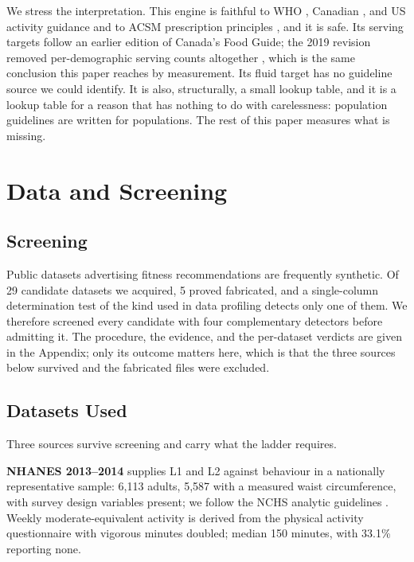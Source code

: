 \documentclass[conference]{IEEEtran}
\begin{document}
We stress the interpretation. This engine is faithful to WHO \cite{bull2020who}, Canadian \cite{ross2020canadian}, and US \cite{piercy2018pag} activity guidance and to ACSM prescription principles \cite{garber2011acsm}, and it is safe. Its serving targets follow an earlier edition of Canada's Food Guide; the 2019 revision removed per-demographic serving counts altogether \cite{healthcanada2019dietary}, which is the same conclusion this paper reaches by measurement. Its fluid target has no guideline source we could identify. It is also, structurally, a small lookup table, and it is a lookup table for a reason that has nothing to do with carelessness: population guidelines are written for populations. The rest of this paper measures what is missing.

\section{Data and Screening}
\label{sec:battery}

\subsection{Screening}
Public datasets advertising fitness recommendations are frequently synthetic. Of 29 candidate datasets we acquired, 5 proved fabricated, and a single-column determination test of the kind used in data profiling \cite{huhtala1999tane, abedjan2015profiling} detects only one of them. We therefore screened every candidate with four complementary detectors before admitting it. The procedure, the evidence, and the per-dataset verdicts are given in the Appendix; only its outcome matters here, which is that the three sources below survived and the fabricated files were excluded.

\subsection{Datasets Used}
Three sources survive screening and carry what the ladder requires.

\textbf{NHANES 2013--2014} \cite{johnson2014nhanes} supplies L1 and L2 against behaviour in a nationally representative sample: 6{,}113 adults, 5{,}587 with a measured waist circumference, with survey design variables present; we follow the NCHS analytic guidelines \cite{nchs2018analytic}. Weekly moderate-equivalent activity is derived from the physical activity questionnaire with vigorous minutes doubled; median 150 minutes, with 33.1\% reporting none.
\end{document}
